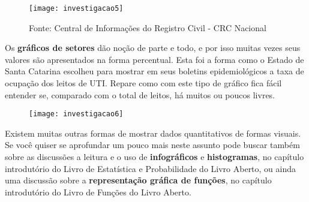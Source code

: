 \begin{figure}[H]
\centering
\texttt{[image: investigacao5]}

\caption{Fonte: Central de Informações do Registro Civil - CRC Nacional}
\end{figure}

Os \textbf{gráficos de setores} dão noção de parte e todo, e por isso muitas vezes seus valores são apresentados na forma percentual. Esta foi a forma como o Estado de Santa Catarina escolheu para mostrar em seus boletins epidemiológicos a taxa de ocupação dos leitos de UTI. Repare como com este tipo de gráfico fica fácil entender se, comparado com o total de leitos, há muitos ou poucos livres.

\begin{figure}[H]
\centering
\texttt{[image: investigacao6]}

\end{figure}


Existem muitas outras formas de mostrar dados quantitativos de formas visuais. Se você quiser se aprofundar um pouco mais neste assunto pode buscar também sobre as discussões a leitura e o uso de \textbf{infográficos} e \textbf{histogramas}, no capítulo introdutório do Livro de Estatística e Probabilidade do Livro Aberto, ou ainda uma discussão sobre a \textbf{representação gráfica de funções}, no capítulo introdutório do Livro de Funções do Livro Aberto. 

